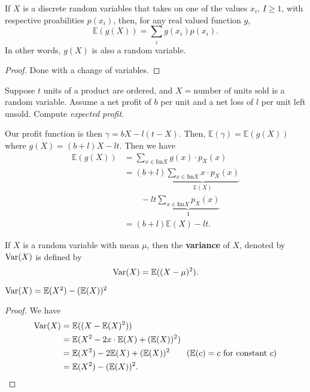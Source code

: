 
\begin{prop}
	If \( X \) is a discrete random variables that takes on one of the values \( x_i \), \( I\ge 1 \), with respective proabilities \( p(x_i) \), then, for any real valued function \( g \), \[
		\mathbb{E}(g(X)) = \sum_{i} g(x_i)p(x_i)
	.\] In other words, \( g(X) \) is also a random variable.
\end{prop}
\begin{proof}
	Done with a change of variables.
\end{proof}

\begin{eg}
	Suppose \( t \) units of a product are ordered, and \( X = \text{number of units sold} \) is a random variable. Assume a net profit of \( b \) per unit and a net loss of \( l \) per unit left unsold. Compute \textit{expected profit}.
\end{eg}
\begin{explanation}
	Our profit function is then \( \gamma = bX - l(t-X) \). Then, \( \mathbb{E}(\gamma ) = \mathbb{E}(g(X)) \) where \( g(X) = (b+l)X - lt \). Then we have
	\begin{align*}
		\mathbb{E}(g(X)) &= \sum_{x \in \text{Im}X} g(x) \cdot p_X(x) \\
										 &= (b+l)\underbrace{\sum_{x \in \text{Im}X} x \cdot p_X(x)}_{\mathbb{E}(X)} \\ & \qquad - lt \underbrace{\sum_{x \in \text{Im}X} p_X(x)}_{1}\\ 
		&= (b+l)\mathbb{E}(X) - lt
	.\end{align*}
\end{explanation}

\begin{definition}
	If \( X \) is a random variable with mean \( \mu  \), then the \textbf{variance} of \( X \), denoted by \( \operatorname{Var}(X) \) is defined by \[
		\operatorname{Var}(X) = \mathbb{E}((X - \mu )^{2} )
	.\] 
\end{definition}

\begin{prop}
	\( \operatorname{Var}(X) = \mathbb{E}(X^{2} ) - (\mathbb{E}(X))^{2} \)
\end{prop}
\begin{proof}
	We have 
	\begin{align*}
		\Var(X) &= \mathbb{E}((X - \mathbb{E}(X)^{2})) \\
						&= \mathbb{E}(X^{2} - 2x\cdot \mathbb{E}(X) + (\mathbb{E}(X))^{2}   ) \\
						&= \mathbb{E}(X^{2} ) - 2 \mathbb{E}(X) + (\mathbb{E}(X))^{2} \tag{\( \mathbb{E}(c) = c \) for constant \( c \)} \\
						&= \mathbb{E}(X^{2} ) - (\mathbb{E}(X))^{2}
	.\end{align*}
\end{proof}

